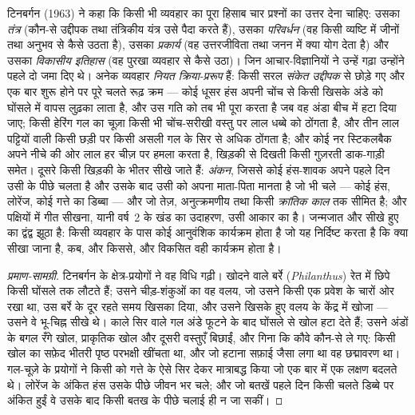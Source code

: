 \begin{definition}[टिनबर्गन के प्रश्न]\label{def:b3:behavioural-ecology:tinbergen}
टिनबर्गन (1963) ने कहा कि किसी भी व्यवहार का पूरा हिसाब चार प्रश्नों का
उत्तर देना चाहिए: उसका \emph{तंत्र} (कौन-से उद्दीपक तथा तंत्रिकीय यंत्र
उसे पैदा करते हैं), उसका \emph{परिवर्धन} (वह किसी व्यष्टि में जीनों तथा
अनुभव से कैसे उठता है), उसका \emph{प्रकार्य} (वह उत्तरजीविता तथा जनन
में क्या योग देता है) और उसका \emph{विकासीय इतिहास} (वह पुरखा व्यवहार
से कैसे उठा)। जिन आचार-विज्ञानियों ने उन्हें गढ़ा उन्होंने पहले दो जमा
दिए थे। अनेक व्यवहार \emph{नियत क्रिया-प्ररूप} हैं: किसी सरल
\emph{संकेत उद्दीपक} से छोड़े गए और एक बार शुरू होने पर पूरे चलते रूढ़
क्रम --- कोई धूसर हंस अपनी चोंच से किसी खिसके अंडे को घोंसले में वापस
लुढ़का लाता है, और उस गति को तब भी पूरा करता है जब वह अंडा बीच में हटा
दिया जाए; किसी हेरिंग गल का चूज़ा किसी भी चोंच-सरीखी वस्तु पर लाल धब्बे
को ठोंगता है, और तीन लाल पट्टियों वाली किसी छड़ी पर किसी असली गल के सिर
से अधिक ठोंगता है; और कोई नर स्टिकलबैक अपने नीचे की ओर लाल हर चीज़ पर
हमला करता है, खिड़की से दिखती किसी गुज़रती डाक-गाड़ी समेत। दूसरे किसी
खिड़की के भीतर सीखे जाते हैं: \emph{अंकन}, जिससे कोई हंस-शावक अपने पहले
दिन उसी के पीछे चलता है और उसके बाद उसी को अपना माता-पिता मानता है जो भी
चले --- कोई हंस, लोरेंज, कोई गत्ते का डिब्बा --- और जो तेज़, अनुत्क्रमणीय
तथा किसी \emph{क्रांतिक काल} तक सीमित है; और पक्षियों में गीत सीखना,
यानी वर्ष~2 के खंड का उदाहरण, उसी आकार का है। जन्मजात और सीखे हुए का
द्वंद्व झूठा है: किसी व्यवहार के पास कोई आनुवंशिक कार्यक्रम होता है जो
यह निर्दिष्ट करता है कि क्या सीखा जाना है, कब, और किससे, और विकसित वही
कार्यक्रम होता है।
\end{definition}

\begin{proof}[प्रमाण-सामग्री]
टिनबर्गन के क्षेत्र-प्रयोगों ने वह विधि गढ़ी। खोदने वाले बर्रे
(\emph{Philanthus}) रेत में छिपे किसी घोंसले तक लौटते हैं; उसने
चीड़-शंकुओं का वह वलय, जो उसने किसी एक प्रवेश के चारों ओर रखा था, उस
बर्रे के दूर रहते समय खिसका दिया, और उसने खिसके हुए वलय के केंद्र में
खोजा --- उसने वे भू-चिह्न सीखे थे। काले सिर वाले गल अंडे फूटने के बाद
घोंसले से खोल हटा देते हैं; उसने अंडों के बगल रँगे खोल, प्राकृतिक खोल
और दूसरी वस्तुएँ बिछाईं, और गिना कि कौवे कौन-से ले गए: किसी खोल का
सफ़ेद भीतरी पृष्ठ परभक्षी खींचता था, और जो हटाना सफ़ाई जैसा लगा था वह
छद्मावरण था। गल-चूज़े के प्रयोगों ने किसी  को गत्ते के ऐसे
सिर देकर मात्राबद्ध किया जो एक बार में एक लक्षण बदलते थे। लोरेंज के
अंकित हंस उसके पीछे जीवन भर चले; और जो बतखें पहले दिन किसी चलते डिब्बे
पर अंकित हुईं वे उसके बाद किसी बतख के पीछे चलाई ही न जा सकीं।
\end{proof}

